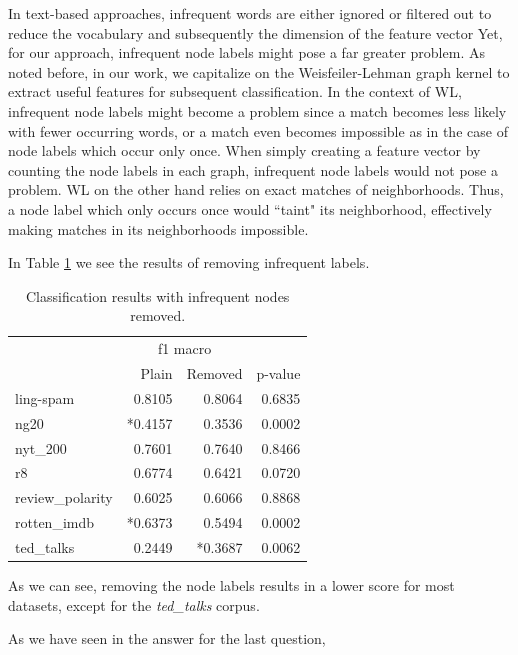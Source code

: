 In text-based approaches, infrequent words are either ignored or filtered out to reduce the vocabulary and subsequently the dimension of the feature vector
Yet, for our approach, infrequent node labels might pose a far greater problem.
As noted before, in our work, we capitalize on the Weisfeiler-Lehman graph kernel to extract useful features for subsequent classification.
In the context of WL, infrequent node labels might become a problem since a match becomes less likely with fewer occurring words, or a match even becomes impossible as in the case of node labels which occur only once.
When simply creating a feature vector by counting the node labels in each graph, infrequent node labels would not pose a problem.
WL on the other hand relies on exact matches of neighborhoods.
Thus, a node label which only occurs once would ``taint" its neighborhood, effectively making matches in its neighborhoods impossible.

In Table \ref{table:results_infrequent_nodes} we see the results of removing infrequent labels.

\begin{table}[htb!]
	\centering
	\begin{tabular}{lrrr}
		&  \multicolumn{2}{c}{f1 macro} &  \\
		 &  Plain &  Removed &  p-value \\
		\midrule
			ling-spam       & 0.8105 & 0.8064 & 0.6835 \\
			ng20            & *0.4157 & 0.3536 & 0.0002 \\
			nyt\_200         & 0.7601 & 0.7640 & 0.8466 \\
			r8              & 0.6774 & 0.6421 & 0.0720 \\
			review\_polarity & 0.6025 & 0.6066 & 0.8868 \\
			rotten\_imdb     & *0.6373 & 0.5494 & 0.0002 \\
			ted\_talks       & 0.2449 & *0.3687 & 0.0062 \\
		\bottomrule
	\end{tabular}
	\caption[Results: Remove infrequent node labels]{Classification results with infrequent nodes removed.}\label{table:results_infrequent_nodes}
\end{table}

As we can see, removing the node labels results in a lower score for most datasets, except for the \textit{ted\_talks} corpus.


As we have seen in the answer for the last question, 


